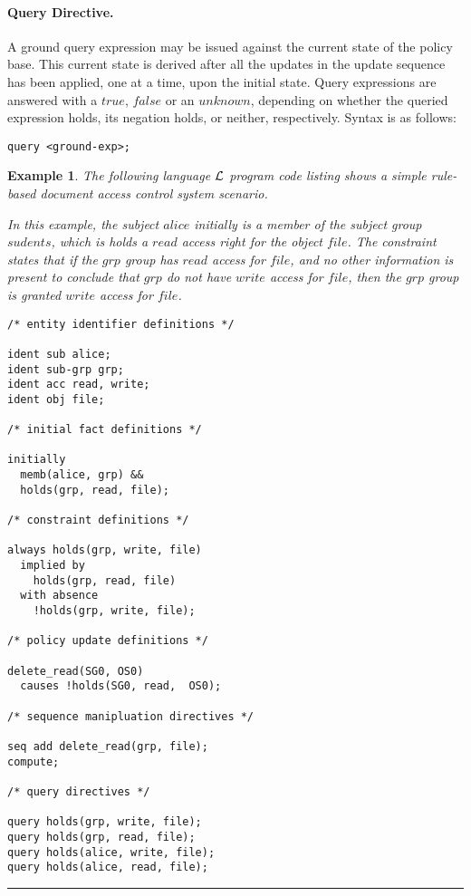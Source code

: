 \documentclass[10pt, twocolumn]{article}
\newtheorem{examp}{Example}
\newenvironment{example}{\begin{examp}\rm}{\rule{2mm}{2mm}\end{examp}}
\begin{document}
        \paragraph{Query Directive.}

          A ground query expression may be issued against the current state of
          the policy base. This current state is derived after all the updates
          in the update sequence has been applied, one at a time, upon the
          initial state. Query expressions are answered with a $true$, $false$
          or an $unknown$, depending on whether the queried expression holds,
          its negation holds, or neither, respectively. Syntax is as follows:

          \begin{verbatim}query <ground-exp>;\end{verbatim} 

        \begin{example}
          The following language ${\cal L}$ program code listing shows a simple
          rule-based document access control system scenario.

          In this example, the subject $alice$ initially is a member of the
          subject group $sudents$, which is holds a $read$ access right for the
          object $file$. The constraint states that if the $grp$ group
          has $read$ access for $file$, and no other information is present to
          conclude that $grp$ do not have $write$ access for $file$, then
          the $grp$ group is granted $write$ access for $file$.

          \begin{verbatim}
/* entity identifier definitions */

ident sub alice;
ident sub-grp grp;
ident acc read, write;
ident obj file;

/* initial fact definitions */

initially 
  memb(alice, grp) &&
  holds(grp, read, file);

/* constraint definitions */

always holds(grp, write, file)
  implied by
    holds(grp, read, file)
  with absence
    !holds(grp, write, file);

/* policy update definitions */

delete_read(SG0, OS0)
  causes !holds(SG0, read,  OS0);

/* sequence manipluation directives */

seq add delete_read(grp, file);
compute;

/* query directives */

query holds(grp, write, file);
query holds(grp, read, file);
query holds(alice, write, file);
query holds(alice, read, file);
          \end{verbatim}
        \end{example}
\end{document}
